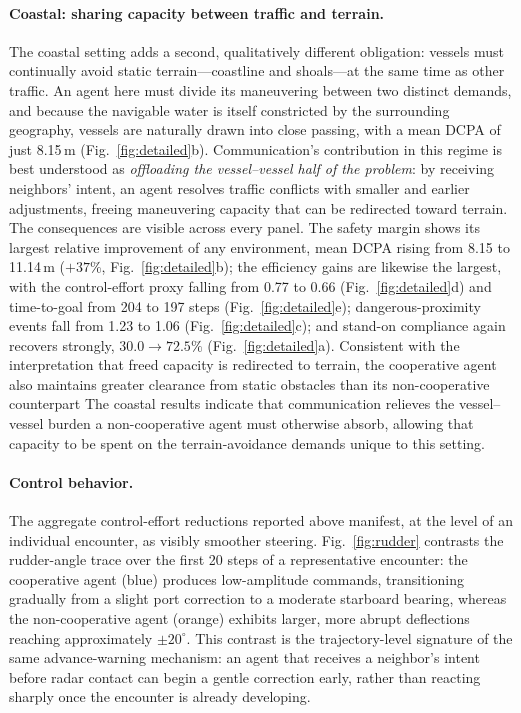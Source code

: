 \documentclass[final,5p,times,twocolumn]{elsarticle}
\begin{document}
{\paragraph{Coastal: sharing capacity between traffic and terrain.}
The coastal setting adds a second, qualitatively different obligation: vessels must continually avoid static terrain---coastline and shoals---at the same time as other traffic. An agent here must divide its maneuvering between two distinct demands, and because the navigable water is itself constricted by the surrounding geography, vessels are naturally drawn into close passing, with a mean DCPA of just 8.15\,m (Fig.~\ref{fig:detailed}b). Communication's contribution in this regime is best understood as \emph{offloading the vessel--vessel half of the problem}: by receiving neighbors' intent, an agent resolves traffic conflicts with smaller and earlier adjustments, freeing maneuvering capacity that can be redirected toward terrain. The consequences are visible across every panel. The safety margin shows its largest relative improvement of any environment, mean DCPA rising from 8.15 to 11.14\,m ($+37\%$, Fig.~\ref{fig:detailed}b); the efficiency gains are likewise the largest, with the control-effort proxy falling from 0.77 to 0.66 (Fig.~\ref{fig:detailed}d) and time-to-goal from 204 to 197 steps (Fig.~\ref{fig:detailed}e); dangerous-proximity events fall from 1.23 to 1.06 (Fig.~\ref{fig:detailed}c); and stand-on compliance again recovers strongly, $30.0 \rightarrow 72.5\%$ (Fig.~\ref{fig:detailed}a). Consistent with the interpretation that freed capacity is redirected to terrain, the cooperative agent also maintains greater clearance from static obstacles than its non-cooperative counterpart
%
 The coastal results indicate that communication relieves the vessel--vessel burden a non-cooperative agent must otherwise absorb, allowing that capacity to be spent on the terrain-avoidance demands unique to this setting.

\paragraph{Control behavior.}
The aggregate control-effort reductions reported above manifest, at the level of an individual encounter, as visibly smoother steering. Fig.~\ref{fig:rudder} contrasts the rudder-angle trace over the first 20 steps of a representative encounter: the cooperative agent (blue) produces low-amplitude commands, transitioning gradually from a slight port correction to a moderate starboard bearing, whereas the non-cooperative agent (orange) exhibits larger, more abrupt deflections reaching approximately $\pm 20^\circ$. This contrast is the trajectory-level signature of the same advance-warning mechanism: an agent that receives a neighbor's intent before radar contact can begin a gentle correction early, rather than reacting sharply once the encounter is already developing.

}
\end{document}
